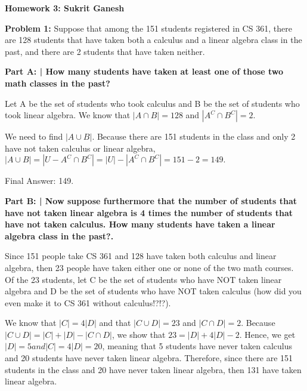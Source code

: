 \documentclass{article}
\begin{document}
 
 \begin{center}
     \Huge\textbf{Homework 3: Sukrit Ganesh}\par
 \end{center}
 
  \noindent\makebox[\linewidth]{\rule{\paperwidth}{0.4pt}}\newline
 
 \begin{center}
      \Large\textbf{Problem 1:} Suppose that among the 151 students registered in CS 361, there are 128 students that have taken both a calculus and a linear algebra class in the past, and there are 2 students that have taken neither. \par
 \end{center}
 
 \textbf{Part A: | How many students have taken at least one of those two math classes in the past?}\newline
 
 Let A be the set of students who took calculus and B be the set of students who took linear algebra. We know that $|A \cap B| = 128$ and $|A^C \cap B^C| = 2.$\newline
 
 We need to find $|A \cup B|$. Because there are 151 students in the class and only 2 have not taken calculus or linear algebra, $ |A \cup B| = |U - A^C \cap B^C| = |U| - |A^C \cap B^C| = 151 - 2 = 149.$ \newline
 
 Final Answer: 149.\newline
 
 \textbf{Part B: | Now suppose furthermore that the number of students that have not taken linear algebra is 4 times the number of students that have not taken calculus. How many students have taken a linear algebra class in the past?.}\newline
 
 Since 151 people take CS 361 and 128 have taken both calculus and linear algebra, then 23 people have taken either one or none of the two math courses. Of the 23 students, let C be the set of students who have NOT taken linear algebra and D be the set of students who have NOT taken calculus (how did you even make it to CS 361 without calculus!?!?).\newline
 
 We know that $|C| = 4|D|$ and that $|C \cup D| = 23$ and $|C \cap D| = 2$. Because $|C \cup D| = |C| + |D| - |C \cap D|$, we show that $23 = |D| + 4|D| - 2$. Hence, we get $|D| = 5 and |C| = 4|D| = 20$, meaning that 5 students have never taken calculus and 20 students have never taken linear algebra. Therefore, since there are 151 students in the class and 20 have never taken linear algebra, then 131 have taken linear algebra. \newline
 
\end{document}

